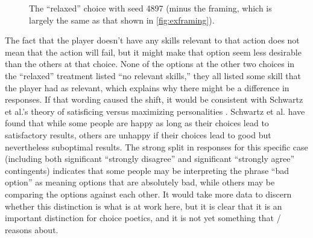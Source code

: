 \begin{figure}[!h]
\centering
{}
  \caption{The ``relaxed'' choice with seed 4897 (minus the framing, which is largely the same as that shown in \cref{fig:exframing}).}
  \label{fig:ch4897}
\end{figure}


The fact that the player doesn't have any skills relevant to that action does not mean that the action will fail, but it might make that option seem less desirable than the others at that choice.
%
None of the options at the other two choices in the ``relaxed'' treatment listed ``no relevant skills,'' they all listed some skill that the player had as relevant, which explains why there might be a difference in responses.
%
If that wording caused the shift, it would be consistent with Schwartz et al.'s theory of satisficing versus maximizing personalities \citep{Schwartz2002}.
%
Schwartz et al. have found that while some people are happy as long as their choices lead to satisfactory results, others are unhappy if their choices lead to good but nevertheless suboptimal results.
%
The strong split in responses for this specific case (including both significant ``strongly disagree'' and significant ``strongly agree'' contingents) indicates that some people may be interpreting the phrase ``bad option'' as meaning options that are absolutely bad, while others may be comparing the options against each other.
%
It would take more data to discern whether this distinction is what is at work here, but it is clear that it is an important distinction for choice poetics, and it is not yet something that \dunyazad/ reasons about.


